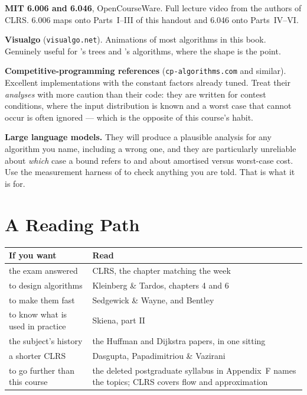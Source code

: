 \begin{conceptbox}
\textbf{MIT 6.006 and 6.046}, OpenCourseWare. Full lecture video from the
authors of CLRS. 6.006 maps onto Parts~I--III of this handout and 6.046 onto
Parts~IV--VI.

\medskip
\textbf{Visualgo} (\texttt{visualgo.net}). Animations of most algorithms in
this book. Genuinely useful for 's trees and
's algorithms, where the shape is the point.

\medskip
\textbf{Competitive-programming references} (\texttt{cp-algorithms.com} and
similar). Excellent implementations with the constant factors already tuned.
Treat their \emph{analyses} with more caution than their code: they are
written for contest conditions, where the input distribution is known and a
worst case that cannot occur is often ignored --- which is the opposite of this
course's habit.

\medskip
\textbf{Large language models.} They will produce a plausible analysis for any
algorithm you name, including a wrong one, and they are particularly unreliable
about \emph{which} case a bound refers to and about amortised versus worst-case
cost. Use the measurement harness of  to check anything you are
told. That is what it is for.
\end{conceptbox}

\section{A Reading Path}

\begin{conceptbox}
\begin{longtable}{@{}L{5.0cm}L{9.5cm}@{}}
\toprule
{}
\textbf{If you want} & \textbf{Read} \\
\midrule
\endhead
the exam answered & CLRS, the chapter matching the week \\
to design algorithms & Kleinberg \& Tardos, chapters 4 and 6 \\
to make them fast & Sedgewick \& Wayne, and Bentley \\
to know what is used in practice & Skiena, part II \\
the subject's history & the Huffman and Dijkstra papers, in one sitting \\
a shorter CLRS & Dasgupta, Papadimitriou \& Vazirani \\
to go further than this course & the deleted postgraduate syllabus in
  Appendix~F names the topics; CLRS covers flow and approximation \\
\bottomrule
\end{longtable}
\end{conceptbox}
